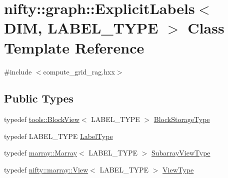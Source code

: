 \hypertarget{classnifty_1_1graph_1_1ExplicitLabels}{}\section{nifty\+:\+:graph\+:\+:Explicit\+Labels$<$ D\+I\+M, L\+A\+B\+E\+L\+\_\+\+T\+Y\+P\+E $>$ Class Template Reference}
\label{classnifty_1_1graph_1_1ExplicitLabels}


{\ttfamily \#include $<$compute\+\_\+grid\+\_\+rag.\+hxx$>$}

\subsection*{Public Types}
\begin{DoxyCompactItemize}
\item 
typedef \hyperlink{classnifty_1_1tools_1_1BlockView}{tools\+::\+Block\+View}$<$ L\+A\+B\+E\+L\+\_\+\+T\+Y\+P\+E $>$ \hyperlink{classnifty_1_1graph_1_1ExplicitLabels_a896653b58048ec52d8e00800279d9b53}{Block\+Storage\+Type}
\item 
typedef L\+A\+B\+E\+L\+\_\+\+T\+Y\+P\+E \hyperlink{classnifty_1_1graph_1_1ExplicitLabels_a3defd2851b5e7071f23a0fdea7aafff0}{Label\+Type}
\item 
typedef \hyperlink{classandres_1_1Marray}{marray\+::\+Marray}$<$ L\+A\+B\+E\+L\+\_\+\+T\+Y\+P\+E $>$ \hyperlink{classnifty_1_1graph_1_1ExplicitLabels_ae07fe2aed8059beb43b043e8a3becdb7}{Subarray\+View\+Type}
\item 
typedef \hyperlink{classandres_1_1View}{nifty\+::marray\+::\+View}$<$ L\+A\+B\+E\+L\+\_\+\+T\+Y\+P\+E $>$ \hyperlink{classnifty_1_1graph_1_1ExplicitLabels_aaab98314403b95503bf0c32e65fd1884}{View\+Type}
\end{DoxyCompactItemize}

